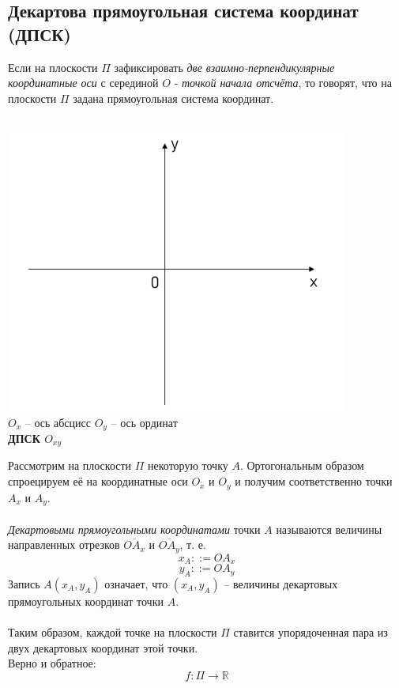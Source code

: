 \documentclass[a4paper, 12pt]{report}
\begin{document}
	\subsection{Декартова прямоугольная система координат (ДПСК)}
	\quad{} Если на плоскости $\Pi$ зафиксировать \textit{две взаимно-перпендикулярные координатные оси} с серединой $O$ - \textit{точкой начала отсчёта}, то говорят, что на плоскости $\Pi$ задана прямоугольная система координат.\\\\
	\begin{center}
		\includegraphics{img/Oxy.png}\\
	    $O_x$ -- ось абсцисс 
		\quad{} $O_y$ -- ось ординат \\ 
		\quad{} \textbf{ДПСК $O_{xy}$}
	\end{center}
	\quad{} Рассмотрим на плоскости $\Pi$ некоторую точку $A$. Ортогональным образом спроецируем её на координатные оси $O_x$ и $O_y$ и получим соответственно точки $A_x$ и $A_y$.\\\\
	\textit{Декартовыми прямоугольными координатами} точки $A$ называются величины направленных отрезков $\overline{OA_x}$ и $\overline{OA_y}$, т. е.
		$$x_A ::= OA_x$$
		$$y_A ::= OA_y$$
	\quad{} Запись $A(x_A, y_A)$ означает, что $(x_A, y_A)$ -- величины декартовых прямоугольных координат точки $A$.\\\\
	\quad{} Таким образом, каждой точке на плоскости $\Pi$ ставится упорядоченная пара из двух декартовых координат этой точки.\\
	Верно и обратное: $$f: \Pi \longrightarrow \mathbb{R}$$\\
\end{document}
